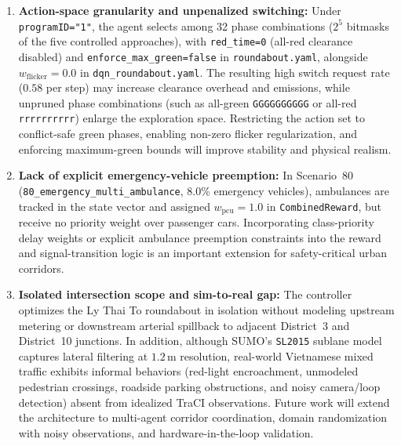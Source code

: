\begin{enumerate}
\item \textbf{Action-space granularity and unpenalized switching:} Under \texttt{programID="1"}, the agent selects among 32 phase combinations ($2^5$ bitmasks of the five controlled approaches), with \texttt{red\_time=0} (all-red clearance disabled) and \texttt{enforce\_max\_green=false} in \texttt{roundabout.yaml}, alongside $w_{\text{flicker}}=0.0$ in \texttt{dqn\_roundabout.yaml}. The resulting high switch request rate ($0.58$ per step) may increase clearance overhead and emissions, while unpruned phase combinations (such as all-green \texttt{GGGGGGGGGG} or all-red \texttt{rrrrrrrrrr}) enlarge the exploration space. Restricting the action set to conflict-safe green phases, enabling non-zero flicker regularization, and enforcing maximum-green bounds will improve stability and physical realism.

\item \textbf{Lack of explicit emergency-vehicle preemption:} In Scenario~80 (\texttt{80\_emergency\_multi\_ambulance}, 8.0\% emergency vehicles), ambulances are tracked in the state vector and assigned $w_{\text{pcu}}=1.0$ in \texttt{CombinedReward}, but receive no priority weight over passenger cars. Incorporating class-priority delay weights or explicit ambulance preemption constraints into the reward and signal-transition logic is an important extension for safety-critical urban corridors.

\item \textbf{Isolated intersection scope and sim-to-real gap:} The controller optimizes the Ly Thai To roundabout in isolation without modeling upstream metering or downstream arterial spillback to adjacent District~3 and District~10 junctions. In addition, although SUMO's \texttt{SL2015} sublane model captures lateral filtering at $1.2\,\mathrm{m}$ resolution, real-world Vietnamese mixed traffic exhibits informal behaviors (red-light encroachment, unmodeled pedestrian crossings, roadside parking obstructions, and noisy camera/loop detection) absent from idealized TraCI observations. Future work will extend the architecture to multi-agent corridor coordination, domain randomization with noisy observations, and hardware-in-the-loop validation.
\end{enumerate}
